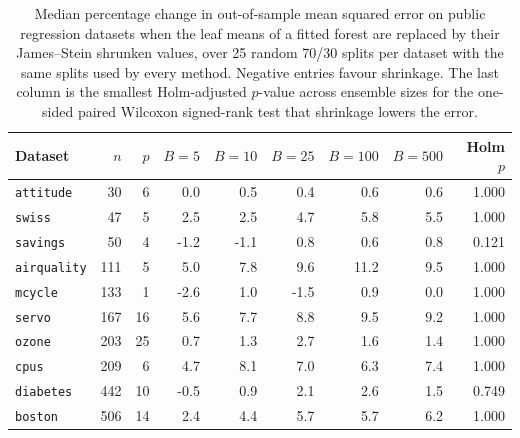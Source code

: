 \begin{table}[htbp]
\centering
\caption{Median percentage change in out-of-sample mean squared error on public regression datasets when the leaf means of a fitted forest are replaced by their James--Stein shrunken values, over 25 random 70/30 splits per dataset with the same splits used by every method. Negative entries favour shrinkage. The last column is the smallest Holm-adjusted $p$-value across ensemble sizes for the one-sided paired Wilcoxon signed-rank test that shrinkage lowers the error.}
\label{tab:bench_gain}
\small
\setlength{\tabcolsep}{4pt}
\begin{tabular}{lrrrrrrrr}
\toprule
Dataset & $n$ & $p$ & $B{=}5$ & $B{=}10$ & $B{=}25$ & $B{=}100$ & $B{=}500$ & Holm $p$ \\
\midrule
\texttt{attitude} & 30 & 6 & 0.0 & 0.5 & 0.4 & 0.6 & 0.6 & 1.000 \\
\texttt{swiss} & 47 & 5 & 2.5 & 2.5 & 4.7 & 5.8 & 5.5 & 1.000 \\
\texttt{savings} & 50 & 4 & -1.2 & -1.1 & 0.8 & 0.6 & 0.8 & 0.121 \\
\texttt{airquality} & 111 & 5 & 5.0 & 7.8 & 9.6 & 11.2 & 9.5 & 1.000 \\
\texttt{mcycle} & 133 & 1 & -2.6 & 1.0 & -1.5 & 0.9 & 0.0 & 1.000 \\
\texttt{servo} & 167 & 16 & 5.6 & 7.7 & 8.8 & 9.5 & 9.2 & 1.000 \\
\texttt{ozone} & 203 & 25 & 0.7 & 1.3 & 2.7 & 1.6 & 1.4 & 1.000 \\
\texttt{cpus} & 209 & 6 & 4.7 & 8.1 & 7.0 & 6.3 & 7.4 & 1.000 \\
\texttt{diabetes} & 442 & 10 & -0.5 & 0.9 & 2.1 & 2.6 & 1.5 & 0.749 \\
\texttt{boston} & 506 & 14 & 2.4 & 4.4 & 5.7 & 5.7 & 6.2 & 1.000 \\
\bottomrule
\end{tabular}
\end{table}
